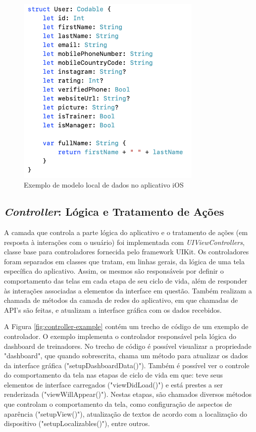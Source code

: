 \begin{figure}[H]
    \centering
    \includegraphics[width=0.8\textwidth]{pfc/figuras/user-model.png}
    \caption{Exemplo de modelo local de dados no aplicativo iOS}
    \label{fig:user-model}
\end{figure}

\subsection{\textit{Controller}: Lógica e Tratamento de Ações}
A camada que controla a parte lógica do aplicativo e o tratamento de ações (em resposta à interações com o usuário) foi implementada com \textit{UIViewControllers}, classe base para controladores fornecida pelo framework UIKit. Os controladores foram separados em classes que tratam, em linhas gerais, da lógica de uma tela específica do aplicativo. Assim, os mesmos são responsáveis por definir o comportamento das telas em cada etapa de seu ciclo de vida, além de responder às interações associadas a elementos da interface em questão. Também realizam a chamada de métodos da camada de redes do aplicativo, em que chamadas de API's são feitas, e atualizam a interface gráfica com os dados recebidos.

A Figura \ref{fig:controller-example} contém um trecho de código de um exemplo de controlador. O exemplo implementa o controlador responsável pela lógica do dashboard de treinadores. No trecho de código é possível visualizar a propriedade "dashboard", que quando sobrescrita, chama um método para atualizar os dados da interface gráfica ("setupDashboardData()"). Também é possível ver o controle do comportamento da tela nas etapas de ciclo de vida em que: teve seus elementos de interface carregados ("viewDidLoad()") e está prestes a ser renderizada ("viewWillAppear()"). Nestas etapas, são chamados diversos métodos que controlam o comportamento da tela, como configuração de aspectos de aparência ("setupView()"), atualização de textos de acordo com a localização do dispositivo ("setupLocalizables()"), entre outros.

